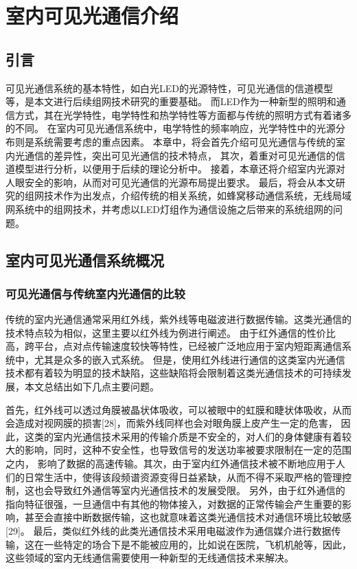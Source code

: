 
\chapter{室内可见光通信介绍}\label{chap:VLC-system}
\section{引言}
可见光通信系统的基本特性，如白光LED的光源特性，可见光通信的信道模型等，是本文进行后续组网技术研究的重要基础。
而LED作为一种新型的照明和通信方式，其在光学特性，电学特性和热学特性等方面都与传统的照明方式有着诸多的不同。
在室内可见光通信系统中，电学特性的频率响应，光学特性中的光源分布则是系统需要考虑的重点因素。
本章中，将会首先介绍可见光通信与传统的室内光通信的差异性，突出可见光通信的技术特点，
其次，着重对可见光通信的信道模型进行分析，以便用于后续的理论分析中。
接着，本章还将介绍室内光源对人眼安全的影响，从而对可见光通信的光源布局提出要求。
最后，将会从本文研究的组网技术作为出发点，介绍传统的相关系统，如蜂窝移动通信系统，无线局域网系统中的组网技术，并考虑以LED灯组作为通信设施之后带来的系统组网的问题。

\section{室内可见光通信系统概况}\label{sec:VLC-background}
\subsection{可见光通信与传统室内光通信的比较}\label{sec:Visible-IR}
传统的室内光通信通常采用红外线，紫外线等电磁波进行数据传输。这类光通信的技术特点较为相似，这里主要以红外线为例进行阐述。
由于红外通信的性价比高，跨平台，点对点传输速度较快等特性，已经被广泛地应用于室内短距离通信系统中，尤其是众多的嵌入式系统。
但是，使用红外线进行通信的这类室内光通信技术都有着较为明显的技术缺陷，这些缺陷将会限制着这类光通信技术的可持续发展，本文总结出如下几点主要问题。

首先，红外线可以透过角膜被晶状体吸收，可以被眼中的虹膜和睫状体吸收，从而会造成对视网膜的损害[28]，而紫外线同样也会对眼角膜上皮产生一定的危害，
因此，这类的室内光通信技术采用的传输介质是不安全的，对人们的身体健康有着较大的影响，同时，这种不安全性，也导致信号的发送功率被要求限制在一定的范围之内，
影响了数据的高速传输。其次，由于室内红外通信技术被不断地应用于人们的日常生活中，使得该段频谱资源变得日益紧缺，从而不得不采取严格的管理控制，这也会导致红外通信等室内光通信技术的发展受限。
另外，由于红外通信的指向特征很强，一旦通信中有其他的物体接入，对数据的正常传输会产生重要的影响，甚至会直接中断数据传输，这也就意味着这类光通信技术对通信环境比较敏感[29]。
最后，类似红外线的此类光通信技术采用电磁波作为通信媒介进行数据传输，这在一些特定的场合下是不能被应用的，比如说在医院，飞机机舱等，因此，这些领域的室内无线通信需要使用一种新型的无线通信技术来解决。

